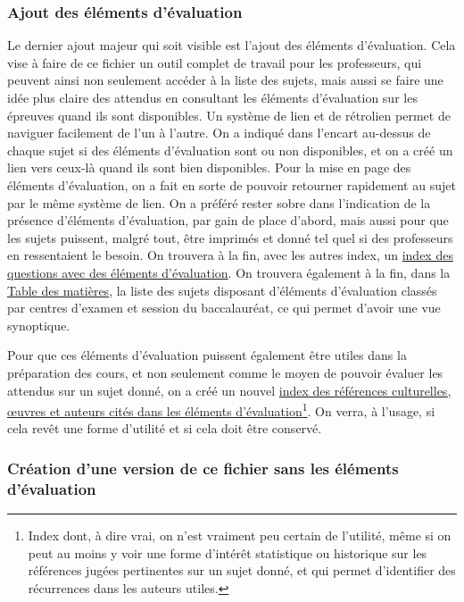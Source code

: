 \subsubsection{Ajout des éléments d'évaluation}

Le dernier ajout majeur qui soit visible est l'ajout des éléments d'évaluation. Cela vise à faire de ce fichier un outil complet de travail pour les professeurs, qui peuvent ainsi non seulement accéder à la liste des sujets, mais aussi se faire une idée plus claire des attendus en consultant les éléments d'évaluation sur les épreuves quand ils sont disponibles. Un système de lien et de rétrolien permet de naviguer facilement de l'un à l'autre. On a indiqué dans l'encart au-dessus de chaque sujet si des éléments d'évaluation sont ou non disponibles, et on a créé un lien vers ceux-là quand ils sont bien disponibles. Pour la mise en page des éléments d'évaluation, on a fait en sorte de pouvoir retourner rapidement au sujet par le même système de lien. On a préféré rester sobre dans l'indication de la présence d'éléments d'évaluation, par gain de place d'abord, mais aussi pour que les sujets puissent, malgré tout, être imprimés et donné tel quel si des professeurs en ressentaient le besoin. On trouvera à la fin, avec les autres index, un \hyperlink{indexc}{index des questions avec des éléments d'évaluation}. On trouvera également à la fin, dans la \hyperlink{TdM}{Table des matières}, la liste des sujets disposant d'éléments d'évaluation classés par centres d'examen et session du baccalauréat, ce qui permet d'avoir une vue synoptique.

Pour que ces éléments d'évaluation puissent également être utiles dans la préparation des cours, et non seulement comme le moyen de pouvoir évaluer les attendus sur un sujet donné, on a créé un nouvel \hyperlink{indexr}{index des références culturelles, œuvres et auteurs cités dans les éléments d'évaluation}\footnote{Index dont, à dire vrai, on n'est vraiment peu certain de l'utilité, même si on peut au moins y voir une forme d'intérêt statistique ou historique sur les références jugées pertinentes sur un sujet donné, et qui permet d'identifier des récurrences dans les auteurs utiles.}. On verra, à l'usage, si cela revêt une forme d'utilité et si cela doit être conservé.

\subsubsection{Création d'une version de ce fichier sans les éléments d'évaluation}

